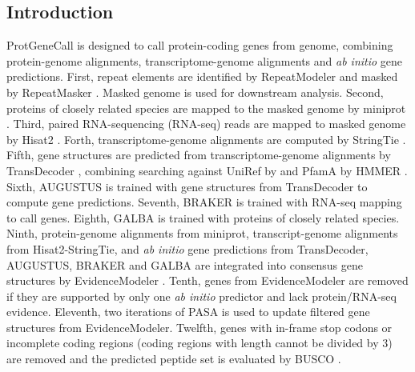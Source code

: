 \documentclass[11pt]{article}
\begin{document}
\begin{sloppypar}
\subsection{Introduction}
ProtGeneCall is designed to call protein-coding genes from genome, combining protein-genome alignments, transcriptome-genome alignments and \textit{ab initio} gene predictions. 
First, repeat elements are identified by RepeatModeler \parencite{smit2015repeatmodeler} and masked by RepeatMasker \parencite{smit2015repeatmasker}. 
Masked genome is used for downstream analysis. 
Second, proteins of closely related species are mapped to the masked genome by miniprot \parencite{li2023protein}. 
Third, paired RNA-sequencing (RNA-seq) reads are mapped to masked genome by Hisat2 \parencite{kim2019graph}. 
Forth, transcriptome-genome alignments are computed by StringTie \parencite{pertea2015stringtie}. 
Fifth, gene structures are predicted from transcriptome-genome alignments by TransDecoder \parencite{haas2016transdecoder}, combining searching against UniRef \parencite{suzek2007uniref} by \parencite{buchfink2015fast} and PfamA \parencite{mistry2021pfam} by HMMER \parencite{eddy1992hmmer}. 
Sixth, AUGUSTUS \parencite{stanke2003gene} is trained with gene structures from TransDecoder to compute gene predictions. 
Seventh, BRAKER \parencite{hoff2019whole} is trained with RNA-seq mapping to call genes. 
Eighth, GALBA \parencite{hoff2019whole} is trained with proteins of closely related species. 
Ninth, protein-genome alignments from miniprot, transcript-genome alignments from Hisat2-StringTie, and \textit{ab initio} gene predictions from TransDecoder, AUGUSTUS, BRAKER and GALBA are integrated into consensus gene structures by EvidenceModeler \parencite{haas2008automated}. 
Tenth, genes from EvidenceModeler are removed if they are supported by only one \textit{ab initio} predictor and lack protein/RNA-seq evidence. 
Eleventh, two iterations of PASA \parencite{haas2008automated} is used to update filtered gene structures from EvidenceModeler. 
Twelfth, genes with in-frame stop codons or incomplete coding regions (coding regions with length cannot be divided by 3) are removed and the predicted peptide set is evaluated by BUSCO \parencite{simao2015busco}.

\end{sloppypar}
\end{document}
